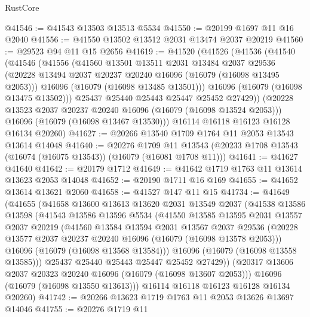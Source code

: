 \begin{lexlean}{RustCore}
\begin{coremodule}
@41546 := @41543 @13503 @13513 @5534
@41550 := @20199 @1697 @11 @16 @2040
@41556 := @41550 @13502 @13512 @2031 @13474 @2037 @20219
@41560 := @29523 @94 @11 @15 @2656
@41619 := @41520
    (@41526
      (@41536
        (@41540
          (@41546
            (@41556
              (@41560
                @13501
                @13511
                @2031
                @13484
                @2037
                @29536
                (@20228 @13494 @2037 @20237 @20240 @16096 (@16079 (@16098 @13495 @2053)))
                @16096
                (@16079 (@16098 @13485 @13501)))
              @16096
              (@16079 (@16098 @13475 @13502)))
            @25437
            @25440
            @25443
            @25447
            @25452
            @27429))
        (@20228 @13523 @2037 @20237 @20240 @16096 (@16079 (@16098 @13524 @2053)))
        @16096
        (@16079 (@16098 @13467 @13530)))
      @16114
      @16118
      @16123
      @16128
      @16134
      @20260)
@41627 := @20266 @13540 @1709 @1764 @11 @2053 @13543 @13614 @14048
@41640 := @20276
    @1709
    @11
    @13543
    (@20233 @1708 @13543 (@16074 (@16075 @13543)) (@16079 (@16081 @1708 @11)))
@41641 := @41627 @41640
@41642 := @20179 @1712
@41649 := @41642 @1719 @1763 @11 @13614 @13623 @2053 @14048
@41652 := @20190 @1711 @16 @169
@41655 := @41652 @13614 @13621 @2060
@41658 := @41527 @147 @11 @15
@41734 := @41649
    (@41655
      (@41658
        @13600
        @13613
        @13620
        @2031
        @13549
        @2037
        (@41538
          @13586
          @13598
          (@41543
            @13586
            @13596
            @5534
            (@41550
              @13585
              @13595
              @2031
              @13557
              @2037
              @20219
              (@41560
                @13584
                @13594
                @2031
                @13567
                @2037
                @29536
                (@20228 @13577 @2037 @20237 @20240 @16096 (@16079 (@16098 @13578 @2053)))
                @16096
                (@16079 (@16098 @13568 @13584)))
              @16096
              (@16079 (@16098 @13558 @13585)))
            @25437
            @25440
            @25443
            @25447
            @25452
            @27429))
        (@20317 @13606 @2037 @20323 @20240 @16096 (@16079 (@16098 @13607 @2053)))
        @16096
        (@16079 (@16098 @13550 @13613)))
      @16114
      @16118
      @16123
      @16128
      @16134
      @20260)
@41742 := @20266 @13623 @1719 @1763 @11 @2053 @13626 @13697 @14046
@41755 := @20276
    @1719
    @11

\end{coremodule}
\end{lexlean}
